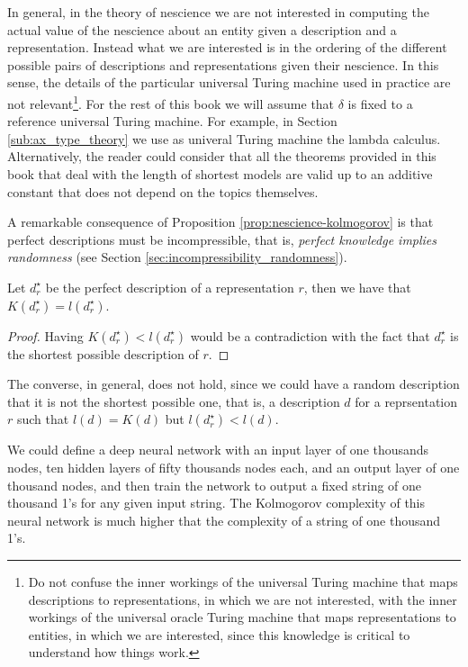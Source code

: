In general, in the theory of nescience we are not interested in computing the actual value of the nescience about an entity given a description and a representation. Instead what we are interested is in the ordering of the different possible pairs of descriptions and representations given their nescience. In this sense, the details of the particular universal Turing machine used in practice are not relevant\footnote{Do not confuse the inner workings of the universal Turing machine that maps descriptions to representations, in which we are not interested, with the inner workings of the universal oracle Turing machine that maps representations to entities, in which we are interested, since this knowledge is critical to understand how things work.}. For the rest of this book we will assume that $\delta$ is fixed to a reference universal Turing machine. For example, in Section \ref{sub:ax_type_theory} we use as univeral Turing machine the lambda calculus. Alternatively, the reader could consider that all the theorems provided in this book that deal with the length of shortest models are valid up to an additive constant that does not depend on the topics themselves.

A remarkable consequence of Proposition \ref{prop:nescience-kolmogorov} is that perfect descriptions must be incompressible, that is, \emph{perfect knowledge implies randomness} (see Section \ref{sec:incompressibility_randomness}).

\begin{corollary}
Let $d_r^{\star}$ be the perfect description of a representation $r$, then we have that $K \left( d_r^{\star} \right) = l \left( d_r^{\star} \right)$.
\end{corollary}
\begin{proof}
Having $K \left( d_r^{\star} \right) < l \left( d_r^{\star} \right)$ would be a contradiction with the fact that $d_r^{\star}$ is the shortest possible description of $r$.
\end{proof}

The converse, in general, does not hold, since we could have a random description that it is not the shortest possible one, that is, a description $d$ for a reprsentation $r$ such that $l(d) = K(d)$ but $l(d_r^{\star}) < l(d)$.

\begin{example}
\label{ex:description_neural}
We could define a deep neural network with an input layer of one thousands nodes, ten hidden layers of fifty thousands nodes each, and an output layer of one thousand nodes, and then train the network to output a fixed string of one thousand 1's for any given input string. The Kolmogorov complexity of this neural network is much higher that the complexity of a string of one thousand 1's.
\end{example}

